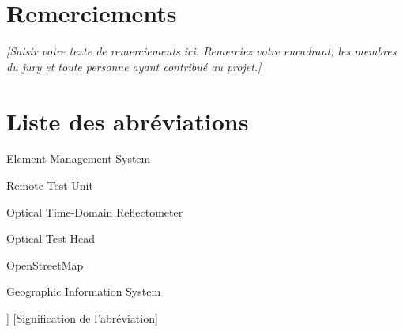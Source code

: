 \documentclass[11pt,a4paper]{article}
\begin{document}
\newpage
{}
\setcounter{page}{1}

\section*{Remerciements}
\textit{[Saisir votre texte de remerciements ici. Remerciez votre encadrant, les membres du jury et toute personne ayant contribué au projet.]}

\newpage

\renewcommand{\contentsname}{Table des matières}
\tableofcontents
{}

\newpage

\renewcommand{\listfigurename}{Liste des figures}
\listoffigures
{}

\newpage

\section*{Liste des abréviations}

\begin{description}[leftmargin=2.5cm, style=nextline]
    \item[EMS] Element Management System
    \item[RTU] Remote Test Unit
    \item[OTDR] Optical Time-Domain Reflectometer
    \item[OTH] Optical Test Head
    \item[OSM] OpenStreetMap
    \item[GIS] Geographic Information System
    \item[[Abreviation]] [Signification de l'abréviation]
\end{description}

\newpage
{}
\setcounter{page}{1}
\end{document}
